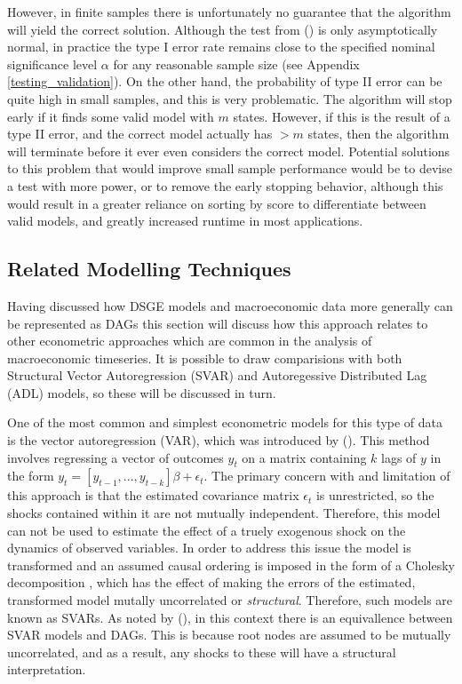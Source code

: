 \documentclass{article}
\begin{document}
However, in finite samples there is unfortunately no guarantee that the algorithm will yield the correct solution. Although the test from \citeauthor{srivastava2005some} (\citeyear{srivastava2005some}) is only asymptotically normal, in practice the type I error rate remains close to the specified nominal significance level $\alpha$ for any reasonable sample size (see Appendix \ref{testing_validation}). On the other hand, the probability of type II error can be quite high in small samples, and this is very problematic. The algorithm will stop early if it finds some valid model with $m$ states. However, if this is the result of a type II error, and the correct model actually has $>m$ states, then the algorithm will terminate before it ever even considers the correct model. Potential solutions to this problem that would improve small sample performance would be to devise a test with more power, or to remove the early stopping behavior, although this would result in a greater reliance on sorting by score to differentiate between valid models, and greatly increased runtime in most applications.

\subsection{Related Modelling Techniques}

Having discussed how DSGE models and macroeconomic data more generally can be represented as DAGs this section will discuss how this approach relates to other econometric approaches which are common in the analysis of macroeconomic timeseries. It is possible to draw comparisions with both Structural Vector Autoregression (SVAR) and Autoregessive Distributed Lag (ADL) models, so these will be discussed in turn.

One of the most common and simplest econometric models for this type of data is the vector autoregression (VAR), which was introduced by \citeauthor{sims1980macroeconomics} (\citeyear{sims1980macroeconomics}). This method involves regressing a vector of outcomes $y_t$ on a matrix containing $k$ lags of $y$ in the form $y_t = [y_{t-1}, ..., y_{t-k}] \beta + \epsilon_t $. The primary concern with and limitation of this approach is that the estimated covariance matrix $\epsilon_t$ is unrestricted, so the shocks contained within it are not mutually independent. Therefore, this model can not be used to estimate the effect of a truely exogenous shock on the dynamics of observed variables. In order to address this issue the model is transformed and an assumed causal ordering is imposed in the form of a Cholesky decomposition \parencite{sims1980macroeconomics}, which has the effect of making the errors of the estimated, transformed model mutally uncorrelated or \textit{structural}. Therefore, such models are known as SVARs. As noted by \citeauthor{demiralp2003searching} (\citeyear{demiralp2003searching}), in this context there is an equivallence between SVAR models and DAGs. This is because root nodes are assumed to be mutually uncorrelated, and as a result, any shocks to these will have a structural interpretation.
\end{document}
